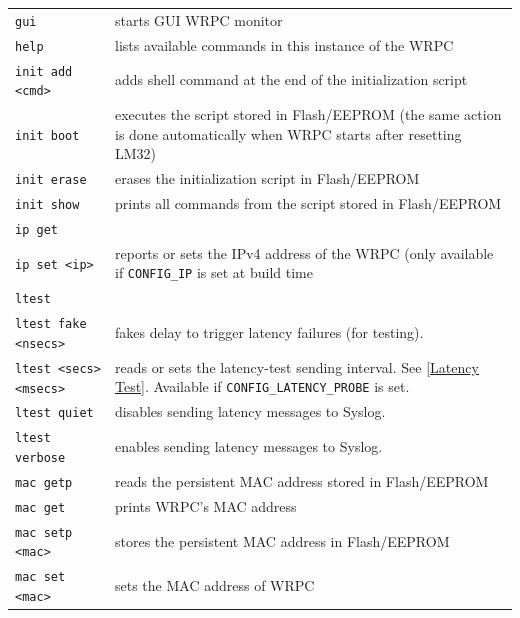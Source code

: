 \documentclass[a4paper, 12pt]{article}
\newcommand{\code}[1]{\texttt{#1}}
\begin{document}
\begin{longtable}{  p{7.5cm}  p{7cm} }
  \code{gui} & starts GUI WRPC monitor \\

  \code{help} & lists available commands in this instance of the WRPC \\

  \code{init add <cmd>} & adds shell command at the end of the initialization
    script \\

  \code{init boot} & executes the script stored in Flash/EEPROM (the same
    action is done automatically when WRPC starts after resetting LM32) \\

  \code{init erase} & erases the initialization script in Flash/EEPROM  \\

  \code{init show} & prints all commands from the script stored in
    Flash/EEPROM \\

  \code{ip get} & \\
  \code{ip set <ip>} & reports or sets the IPv4 address of the WRPC (only
    available if \texttt{CONFIG\_IP} is set at build time \\

  \code{ltest} & \\
  \code{ltest fake <nsecs>} & fakes delay to trigger latency failures (for
    testing). \\

  \code{ltest <secs> <msecs>} & reads or sets the latency-test sending
    interval. See \ref{Latency Test}. Available if
    \texttt{CONFIG\_LATENCY\_PROBE} is set. \\

  \code{ltest quiet} & disables sending latency messages to Syslog. \\

  \code{ltest verbose} & enables sending latency messages to Syslog. \\

  \code{mac getp} & reads the persistent MAC address stored in Flash/EEPROM \\

  \code{mac get} & prints WRPC's MAC address \\

  \code{mac setp <mac>} & stores the persistent MAC address in Flash/EEPROM \\

  \code{mac set <mac>} & sets the MAC address of WRPC \\


\end{longtable}
\end{document}
